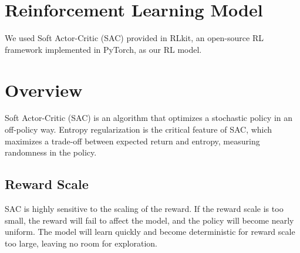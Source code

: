 \section{Reinforcement Learning Model}
We used Soft Actor-Critic (SAC) \cite{haarnoja2018soft} provided in RLkit, an open-source RL framework implemented in PyTorch\cite{pongrlkit}, as our RL model.
\par
\section{Overview}
Soft Actor-Critic (SAC) is an algorithm that optimizes a stochastic policy in an off-policy way.
Entropy regularization is the critical feature of SAC, which maximizes a trade-off between expected return and entropy, measuring randomness in the policy.
\par
\subsection{Reward Scale}
SAC is highly sensitive to the scaling of the reward. If the reward scale is too small, the reward will fail to affect the model, and the policy will become nearly uniform. The model will learn quickly and become deterministic for reward scale too large, leaving no room for exploration.
\\
\\
\\
\\
\\